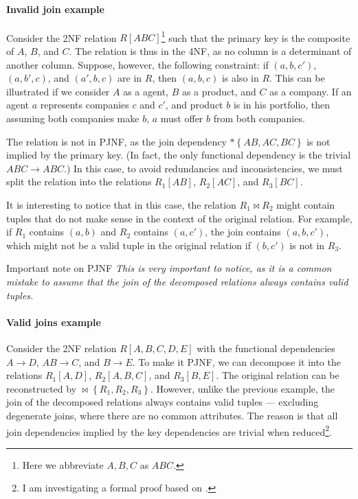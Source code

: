 \paragraph{Invalid join example} Consider the 2NF relation $R[ABC]$\footnote{Here we abbreviate ${A,
B, C}$ as $ABC$.} such that the primary key is the composite of $A$, $B$, and $C$.  The
relation is thus in the 4NF, as no column is a determinant of another column.  Suppose,
however, the following constraint: if $(a, b, c')$, $(a, b', c)$, and $(a', b, c)$ are in
$R$, then $(a, b, c)$ is also in $R$.  This can be illustrated if we consider $A$ as a
agent, $B$ as a product, and $C$ as a company.  If an agent $a$ represents companies $c$ and
$c'$, and product $b$ is in his portfolio, then assuming both companies make $b$, $a$
must offer $b$ from both companies.

The relation is not in PJNF, as the join dependency $* \left\{ AB, AC, BC \right\}$ is not
implied by the primary key.  (In fact, the only functional dependency is the trivial $ABC
\to ABC$.)  In this case, to avoid redundancies and inconsistencies, we must split the
relation into the relations $R_1[AB]$, $R_2[AC]$, and $R_3[BC]$.

It is interesting to notice that in this case, the relation $R_1 \bowtie R_2$ might
contain tuples that do not make sense in the context of the original relation.  For
example, if $R_1$ contains $(a, b)$ and $R_2$ contains $(a, c')$, the join contains
$(a, b, c')$, which might not be a valid tuple in the original relation if $(b, c')$ is
not in $R_3$.

\begin{hlbox}{Important note on PJNF}
  \em
  This is very important to notice, as it is a common mistake to assume
  that the join of the decomposed relations always contains valid tuples.
\end{hlbox}

\paragraph{Valid joins example}  Consider the 2NF relation $R[A, B, C, D, E]$ with the functional
dependencies $A \to D$, $AB \to C$, and $B \to E$.  To make it PJNF, we can decompose it
into the relations $R_1[A, D]$, $R_2[A, B, C]$, and $R_3[B, E]$.  The original relation can
be reconstructed by $\bowtie \left\{ R_1, R_2, R_3 \right\}$.  However, unlike the
previous example, the join of the decomposed relations always contains valid tuples
--- excluding degenerate joins, where there are no common attributes.
The reason is that all join dependencies implied by the key dependencies are trivial when
reduced\footnote{I am investigating a formal proof based on .}.

